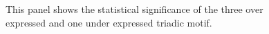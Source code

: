 \begin{figure}[!ht]
    
    
\caption{This panel shows the statistical significance of the three over expressed and one under expressed triadic motif. 
}
\end{figure}